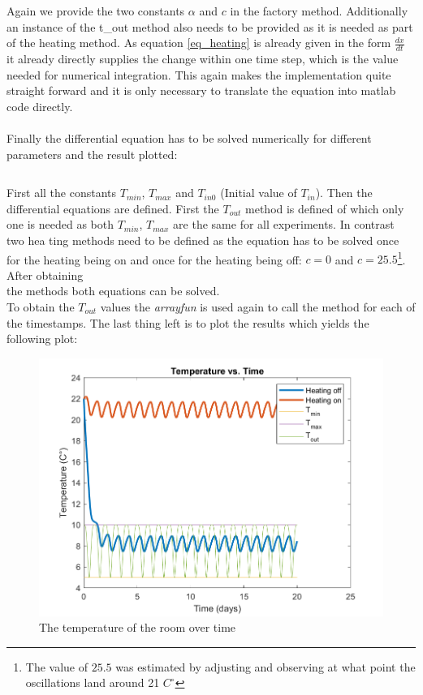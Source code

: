\documentclass[14pt]{article}
\begin{document}
\inputminted[linenos]{octave}{./matlab/make_heating.m}

Again we provide the two constants $\alpha$ and $c$ in the factory method. Additionally an instance of the t\_out
method also needs to be provided as it is needed as part of the heating method. As equation \ref{eq_heating} is already
given in the form $\frac{dx}{dt}$ it already directly supplies the change within one time step, which is the value
needed for numerical integration. This again makes the implementation quite straight forward and it is only necessary
to translate the equation into matlab code directly.\\
\\
Finally the differential equation has to be solved numerically for different parameters and the result plotted:

\inputminted[linenos]{octave}{./matlab/assignment_3.m}

First all the constants $T_{min}$, $T_{max}$ and $T_{in 0}$ (Initial value of $T_{in}$). Then the differential
equations are defined. First the $T_{out}$ method is defined of which only one is needed as both $T_{min}$, ${T_{max}}$
are the same for all experiments. In contrast two hea ting methods need to be defined as the equation has to be solved
once for the heating being on and once for the heating being off: $c = 0 $ and $c = 25.5$\footnote{The value of $25.5$ was
estimated by adjusting and observing at what point the oscillations land around 21 $C^{\circ}$}. After obtaining\\
the methods both equations can be solved. 
\\
To obtain the $T_{out}$ values the \textit{arrayfun} is used again to call the method
for each of the timestamps. The last thing left is to plot the results which yields the following plot:

\begin{figure}[H]
  \includegraphics[width=14cm]{./output/assignment3.png}
  \caption{The temperature of the room over time}
  \label{fig:figure7}
\end{figure}

\printbibliography
\end{document}
